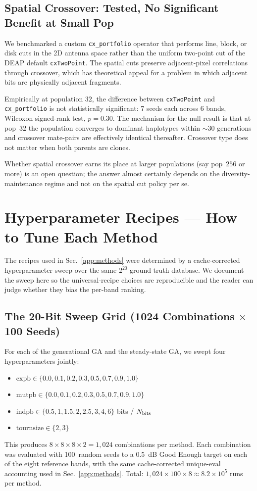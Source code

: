 \subsection{Spatial Crossover: Tested, No Significant Benefit at Small Pop}

We benchmarked a custom \texttt{cx\_portfolio} operator that
performs line, block, or disk cuts in the 2D antenna space rather
than the uniform two-point cut of the DEAP default
\texttt{cxTwoPoint}. The spatial cuts preserve adjacent-pixel
correlations through crossover, which has theoretical appeal for a
problem in which adjacent bits are physically adjacent fragments.

Empirically at population $32$, the difference between
\texttt{cxTwoPoint} and \texttt{cx\_portfolio} is not statistically
significant: 7 seeds each across 6 bands, Wilcoxon signed-rank
test, $p = 0.30$. The mechanism for the null result is that at
pop~$32$ the population converges to dominant haplotypes within
$\sim\!30$ generations and crossover mate-pairs are effectively
identical thereafter. Crossover type does not matter when both
parents are clones.

Whether spatial crossover earns its place at larger populations
(say pop~$256$ or more) is an open question; the answer almost
certainly depends on the diversity-maintenance regime and not on
the spatial cut policy per se.

\section{Hyperparameter Recipes --- How to Tune Each Method}
\label{app:recipes}

The recipes used in Sec.~\ref{app:methods} were determined by a
cache-corrected hyperparameter sweep over the same $2^{20}$
ground-truth database. We document the sweep here so the
universal-recipe choices are reproducible and the reader can judge
whether they bias the per-band ranking.

\subsection{The 20-Bit Sweep Grid (1024 Combinations $\times$ 100 Seeds)}

For each of the generational GA and the steady-state GA, we swept
four hyperparameters jointly:
\begin{itemize}
\item $\mathrm{cxpb} \in \{0.0, 0.1, 0.2, 0.3, 0.5, 0.7, 0.9, 1.0\}$
\item $\mathrm{mutpb} \in \{0.0, 0.1, 0.2, 0.3, 0.5, 0.7, 0.9, 1.0\}$
\item $\mathrm{indpb} \in \{0.5, 1, 1.5, 2, 2.5, 3, 4, 6\}$ bits / $N_{\rm bits}$
\item $\mathrm{tournsize} \in \{2, 3\}$
\end{itemize}
This produces $8 \times 8 \times 8 \times 2 = 1{,}024$ combinations
per method. Each combination was evaluated with 100~random seeds to
a 0.5~dB Good Enough target on each of the eight reference bands,
with the same cache-corrected unique-eval accounting used in
Sec.~\ref{app:methods}. Total: $1{,}024 \times 100 \times 8 \approx
8.2 \times 10^5$ runs per method.

